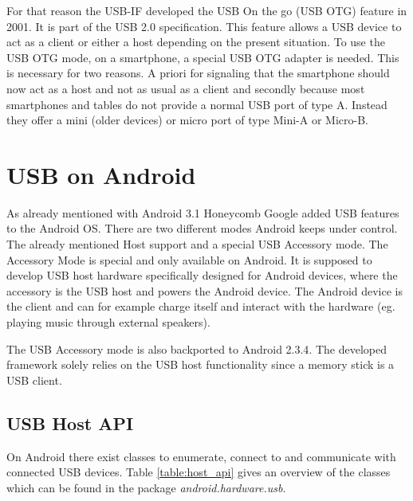 For that reason the USB-IF developed the USB On the go (USB OTG) feature in 2001. It is part of the USB 2.0 specification\cite{wiki_usb}. This feature allows a USB device to act as a client or either a host depending on the present situation. To use the USB OTG mode, on a smartphone, a special USB OTG adapter is needed. This is necessary for two reasons. A priori for signaling that the smartphone should now act as a host and not as usual as a client and secondly because most smartphones and tables do not provide a normal USB port of type A. Instead they offer a mini (older devices) or micro port of type Mini-A or Micro-B\cite{wiki_usb_otg}. 

\chapter{USB on Android}

As already mentioned with Android 3.1 Honeycomb Google added USB features to the Android OS. There are two different modes Android keeps under control. The already mentioned Host support and a special USB Accessory mode. The Accessory Mode is special and only available on Android. It is supposed to develop USB host hardware specifically designed for Android devices, where the accessory is the USB host and powers the Android device\cite{android_usb_accessory}. The Android device is the client and can for example charge itself and interact with the hardware (eg. playing music through external speakers). 

The USB Accessory mode is also backported to Android 2.3.4\cite{android_usb_accessory}. The developed framework solely relies on the USB host functionality since a memory stick is a USB client.

\section{USB Host API}

On Android there exist classes to enumerate, connect to and communicate with connected USB devices. Table \ref{table:host_api} gives an overview of the classes which can be found in the package \textit{android.hardware.usb}.

